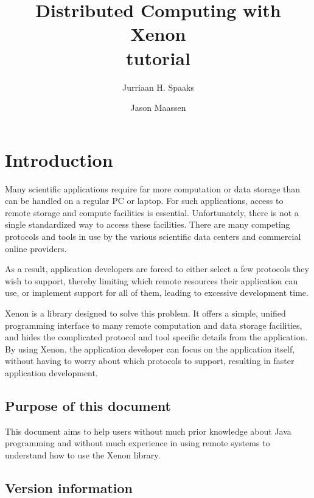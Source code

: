 \documentclass[12pt, a4paper, twoside,openany,titlepage]{article}
\author{Jurriaan H. Spaaks \and Jason Maassen}
\title{\textbf{Distributed Computing with Xenon} \\ tutorial}
\newcommand{\insertemptypage}[0]{
\vfill
\newpage
\thispagestyle{empty}
\mbox{}
\pagebreak
}
\begin{document}
\maketitle

\insertemptypage{}

\pagestyle{plain}
\frontmatter

\tableofcontents
\insertemptypage{}

\mainmatter


\section{Introduction}

Many scientific applications require far more computation or data storage than can be handled on a regular PC or laptop. For such applications, access to remote storage and compute facilities is essential. Unfortunately, there is not a single standardized way to access these facilities. There are many competing protocols and tools in use by the various scientific data centers and commercial online providers.

As a result, application developers are forced to either select a few protocols they wish to support, thereby limiting which remote resources their application can use, or implement support for all of them, leading to excessive development time.

Xenon is a library designed to solve this problem. It offers a simple, unified programming interface to many remote computation and data storage facilities, and hides the complicated protocol and tool specific details from the application. By using Xenon, the application developer can focus on the application itself, without having to worry about which protocols to support, resulting in faster application development.


\subsection{Purpose of this document}

This document aims to help users without much prior knowledge about Java programming and without much experience in using remote systems to understand how to use the Xenon library.

\subsection{Version information}
\end{document}
